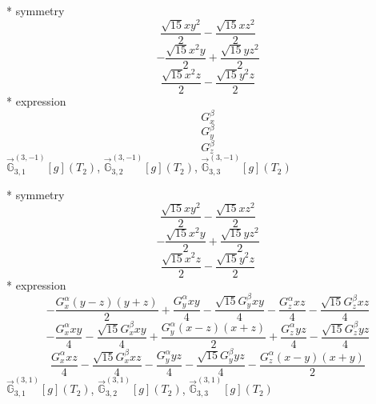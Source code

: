 \documentclass[fleqn,8pt]{jsarticle}
\begin{document}
\noindent\quad ** symmetry
\begin{dmath*}
\frac{\sqrt{15} x y^{2}}{2} - \frac{\sqrt{15} x z^{2}}{2}
\end{dmath*}
\begin{dmath*}
- \frac{\sqrt{15} x^{2} y}{2} + \frac{\sqrt{15} y z^{2}}{2}
\end{dmath*}
\begin{dmath*}
\frac{\sqrt{15} x^{2} z}{2} - \frac{\sqrt{15} y^{2} z}{2}
\end{dmath*}
\noindent\quad ** expression
\begin{dmath*}
G_{x}^{\beta}
\end{dmath*}
\begin{dmath*}
G_{y}^{\beta}
\end{dmath*}
\begin{dmath*}
G_{z}^{\beta}
\end{dmath*}
\noindent\quad $\vec{\mathbb{G}}_{3,1}^{(3,-1)}[g](T_{2})$, $\vec{\mathbb{G}}_{3,2}^{(3,-1)}[g](T_{2})$, $\vec{\mathbb{G}}_{3,3}^{(3,-1)}[g](T_{2})$

\noindent\quad ** symmetry
\begin{dmath*}
\frac{\sqrt{15} x y^{2}}{2} - \frac{\sqrt{15} x z^{2}}{2}
\end{dmath*}
\begin{dmath*}
- \frac{\sqrt{15} x^{2} y}{2} + \frac{\sqrt{15} y z^{2}}{2}
\end{dmath*}
\begin{dmath*}
\frac{\sqrt{15} x^{2} z}{2} - \frac{\sqrt{15} y^{2} z}{2}
\end{dmath*}
\noindent\quad ** expression
\begin{dmath*}
- \frac{G_{x}^{\alpha} \left(y - z\right) \left(y + z\right)}{2} + \frac{G_{y}^{\alpha} x y}{4} - \frac{\sqrt{15} G_{y}^{\beta} x y}{4} - \frac{G_{z}^{\alpha} x z}{4} - \frac{\sqrt{15} G_{z}^{\beta} x z}{4}
\end{dmath*}
\begin{dmath*}
- \frac{G_{x}^{\alpha} x y}{4} - \frac{\sqrt{15} G_{x}^{\beta} x y}{4} + \frac{G_{y}^{\alpha} \left(x - z\right) \left(x + z\right)}{2} + \frac{G_{z}^{\alpha} y z}{4} - \frac{\sqrt{15} G_{z}^{\beta} y z}{4}
\end{dmath*}
\begin{dmath*}
\frac{G_{x}^{\alpha} x z}{4} - \frac{\sqrt{15} G_{x}^{\beta} x z}{4} - \frac{G_{y}^{\alpha} y z}{4} - \frac{\sqrt{15} G_{y}^{\beta} y z}{4} - \frac{G_{z}^{\alpha} \left(x - y\right) \left(x + y\right)}{2}
\end{dmath*}
\noindent\quad $\vec{\mathbb{G}}_{3,1}^{(3,1)}[g](T_{2})$, $\vec{\mathbb{G}}_{3,2}^{(3,1)}[g](T_{2})$, $\vec{\mathbb{G}}_{3,3}^{(3,1)}[g](T_{2})$
\end{document}
